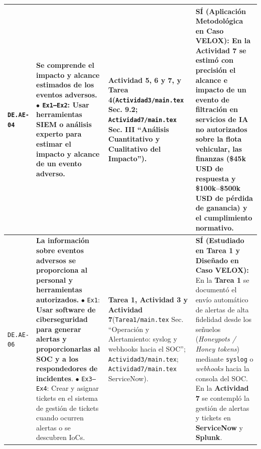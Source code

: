 \documentclass[letterpaper,11pt]{article}
\begin{document}
\begin{longtable}{|C{1.5cm}|L{5.3cm}|L{4.3cm}|L{5.8cm}|}
\texttt{DE.AE-04} &
\textbf{Se comprende el impacto y alcance estimados de los eventos adversos.}\newline
$\bullet$ \texttt{Ex1--Ex2}: Usar herramientas SIEM o análisis experto para estimar el impacto y alcance de un evento adverso. &
\textbf{Actividad 5, 6 y 7, y Tarea 4}\newline (\texttt{Actividad3/main.tex} Sec. 9.2; \texttt{Actividad7/main.tex} Sec. III ``Análisis Cuantitativo y Cualitativo del Impacto''). &
\textbf{SÍ (Aplicación Metodológica en Caso VELOX):}\newline
En la Actividad 7 se estimó con precisión el alcance e impacto de un evento de filtración en servicios de IA no autorizados sobre la flota vehicular, las finanzas (\$45k USD de respuesta y \$100k--\$500k USD de pérdida de ganancia) y el cumplimiento normativo. \\
\hline

\texttt{DE.AE-06} &
\textbf{La información sobre eventos adversos se proporciona al personal y herramientas autorizados.}\newline
$\bullet$ \texttt{Ex1}: \textbf{Usar software de ciberseguridad para generar alertas y proporcionarlas al SOC y a los respondedores de incidentes}.\newline
$\bullet$ \texttt{Ex3--Ex4}: Crear y asignar tickets en el sistema de gestión de tickets cuando ocurren alertas o se descubren IoCs. &
\textbf{Tarea 1, Actividad 3 y Actividad 7}\newline (\texttt{Tarea1/main.tex} Sec. ``Operación y Alertamiento: syslog y webhooks hacia el SOC''; \texttt{Actividad3/main.tex}; \texttt{Actividad7/main.tex} ServiceNow). &
\textbf{SÍ (Estudiado en Tarea 1 y Diseñado en Caso VELOX):}\newline
En la \textbf{Tarea 1} se documentó el envío automático de alertas de alta fidelidad desde los señuelos (\textit{Honeypots / Honey tokens}) mediante \texttt{syslog} o \textit{webhooks} hacia la consola del SOC. En la \textbf{Actividad 7} se contempló la gestión de alertas y tickets en \textbf{ServiceNow} y \textbf{Splunk}. \\
\hline


\end{longtable}
\end{document}
